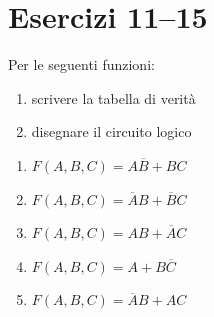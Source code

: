 \documentclass[a4paper,12pt]{article}
\begin{document}
	\section*{Esercizi 11--15}
	
	Per le seguenti funzioni:
	
	\begin{enumerate}
		\item scrivere la tabella di verità
		\item disegnare il circuito logico
	\end{enumerate}
	
	\begin{enumerate}
		
		\item $F(A,B,C)=A\overline{B}+BC$
		
		\item $F(A,B,C)=\overline{A}B+\overline{B}C$
		
		\item $F(A,B,C)=AB+\overline{A}C$
		
		\item $F(A,B,C)=A+B\overline{C}$
		
		\item $F(A,B,C)=\overline{A}B+AC$
		
	\end{enumerate}
	
\end{document}

